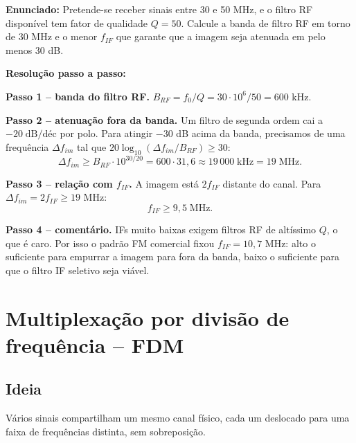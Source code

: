 \documentclass[11pt,a4paper]{article}
\begin{document}
\begin{exercicio}
\textbf{Enunciado:} Pretende-se receber sinais entre 30 e 50 MHz, e o filtro RF disponível tem fator de qualidade $Q=50$. Calcule a banda de filtro RF em torno de 30 MHz e o menor $f_{IF}$ que garante que a imagem seja atenuada em pelo menos 30 dB.

\textbf{Resolução passo a passo:}

\textbf{Passo 1 -- banda do filtro RF.}
$B_{RF} = f_0/Q = 30\!\cdot\!10^{6}/50 = 600$ kHz.

\textbf{Passo 2 -- atenuação fora da banda.}
Um filtro de segunda ordem cai a $-20\;\text{dB/déc}$ por polo. Para atingir $-30$ dB acima da banda, precisamos de uma frequência $\Delta f_{im}$ tal que $20\log_{10}(\Delta f_{im}/B_{RF}) \geq 30$:
\[
  \Delta f_{im} \geq B_{RF}\!\cdot\!10^{30/20} = 600\!\cdot\!31{,}6 \approx 19\,000\;\text{kHz} = 19\;\text{MHz}.
\]

\textbf{Passo 3 -- relação com $f_{IF}$.}
A imagem está $2 f_{IF}$ distante do canal. Para $\Delta f_{im} = 2 f_{IF} \geq 19$ MHz:
\[
  f_{IF} \geq 9{,}5\;\text{MHz}.
\]

\textbf{Passo 4 -- comentário.}
IFs muito baixas exigem filtros RF de altíssimo $Q$, o que é caro. Por isso o padrão FM comercial fixou $f_{IF}=10{,}7$ MHz: alto o suficiente para empurrar a imagem para fora da banda, baixo o suficiente para que o filtro IF seletivo seja viável.
\end{exercicio}

\section{Multiplexação por divisão de frequência -- FDM}

\subsection{Ideia}

Vários sinais compartilham um mesmo canal físico, cada um deslocado para uma faixa de frequências distinta, sem sobreposição.
\end{document}
